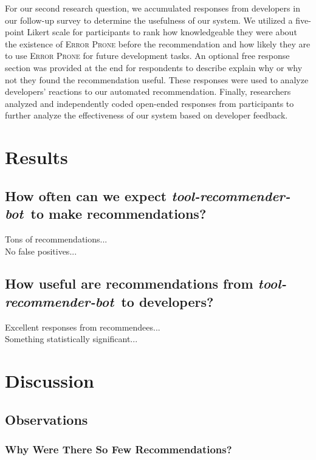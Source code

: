 \documentclass[conference]{IEEEtran}
\newcommand{\tool}{\textsl{tool-recommender-bot}}
\newcommand{\pseudosubsection}[1]{\vspace{2mm} \noindent{\it #1}}
\begin{document}
\pseudosubsection{RQ2}

For our second research question, we accumulated responses from developers in our follow-up survey to determine the usefulness of our system. We utilized a five-point Likert scale for participants to rank how knowledgeable they were about the existence of \textsc{Error Prone} before the recommendation and how likely they are to use \textsc{Error Prone} for future development tasks. An optional free response section was provided at the end for respondents to describe explain why or why not they found the recommendation useful. These responses were used to analyze developers' reactions to our automated recommendation. Finally, researchers analyzed and independently coded open-ended responses from participants to further analyze the effectiveness of our system based on developer feedback.

\section{Results}

\subsection{How often can we expect \tool~to make recommendations?}

Tons of recommendations... \\

No false positives...

\subsection{How useful are recommendations from \tool~to developers?}

Excellent responses from recommendees...\\

Something statistically significant...

\section{Discussion}

\subsection{Observations}

\subsubsection{Why Were There So Few Recommendations?}
\end{document}
